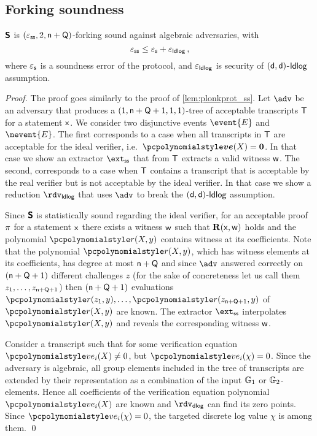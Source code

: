 \documentclass[runningheads,10pt]{llncs}
\let\spvec\vec
\let\vec\accentvec
\let\spvec\vec
\let\vec\spvec
\def\vec#1{\mathchoice{\mbox{\boldmath$\displaystyle#1$}}
  {\mbox{\boldmath$\textstyle#1$}} {\mbox{\boldmath$\scriptstyle#1$}}
  {\mbox{\boldmath$\scriptscriptstyle#1$}}}
\begin{document}
\subsection{Forking soundness}
\begin{lemma}
	\label{lem:sonicprot_ss}
  $\bm{\mathsf{S}}$ is $(\varepsilon_{\mathsf{ss}}, 2, \mathsf{n} + \mathsf{Q})$-forking sound against
  algebraic adversaries, with
  \[
			\varepsilon_{\mathsf{ss}} \leq \varepsilon_{\mathsf{s}} + \varepsilon_{\mathsf{ldlog}}\,,
	\]
	where $\varepsilon_{\mathsf{s}}$ is a soundness error of the protocol, and $\varepsilon_{\mathsf{ldlog}}$ is
  security of $(\mathsf{d}, \mathsf{d})$-$\mathsf{ldlog}$ assumption.
\end{lemma}
\begin{proof}
  The proof goes similarly to the proof of \cref{lem:plonkprot_ss}.
%
  Let $\adv$ be an adversary that produces a
  $(1, \mathsf{n} + \mathsf{Q} + 1, 1, 1)$-tree of acceptable transcripts
  $\mathsf{T}$ for a statement $\mathsf{x}$. We consider two disjunctive events $\event{E}$
  and $\nevent{E}$. The first corresponds to a case when all transcripts in
  $\mathsf{T}$ are acceptable for the ideal verifier,
  i.e.~$\vec{\vereq}(X) = \vec{0}$. In that case we show an extractor $\extss$
  that from $\mathsf{T}$ extracts a valid witness $\mathsf{w}$. The second, corresponds to
  a case when $\mathsf{T}$ contains a transcript that is acceptable by the real
  verifier but is not acceptable by the ideal verifier.  In that case we show a
  reduction $\rdvldlog$ that uses $\adv$ to break the
  $(\mathsf{d}, \mathsf{d})$-$\mathsf{ldlog}$ assumption.

   Since $\bm{\mathsf{S}}$ is statistically sound
  regarding the ideal verifier, for an acceptable proof $\pi$ for a
  statement $\mathsf{x}$ there exists a witness $\mathsf{w}$ such that $\mathbf{R}(\mathsf{x}, \mathsf{w})$
  holds and the polynomial $\p{r}(X, y)$ contains witness at its coefficients.
  Note that the polynomial $\p{r}(X, y)$, which has witness elements at its
  coefficients, has degree at most $\mathsf{n} + \mathsf{Q}$ and since $\adv$
  answered correctly on $(\mathsf{n} + \mathsf{Q} + 1)$ different challenges
  $z$ (for the sake of concreteness let us call them
  $z_1, \ldots, z_{\mathsf{n} + \mathsf{Q} + 1}$) then
  $(\mathsf{n} + \mathsf{Q} + 1)$ evaluations
  $\p{r}(z_1, y), \ldots, \p{r}(z_{\multconstr + \linconstr + 1}, y)$ of
  $\p{r}(X, y)$ are known. The extractor $\extss$ interpolates $\p{r}(X, y)$ and
  reveals the corresponding witness $\mathsf{w}$.

   Consider a transcript such that for some
  verification equation $\vereq_i(X) \neq 0$, but $\vereq_i(\chi) = 0$. Since
  the adversary is algebraic, all group elements included in the tree of
  transcripts are extended by their representation as a combination of the input
  $\mathbb{G}_1$ or $\mathbb{G}_2$-elements. Hence all coefficients of the verification
  equation polynomial $\vereq_i(X)$ are known and $\rdvdlog$ can find its zero
  points. Since $\vereq_i(\chi) = 0$, the targeted discrete log value $\chi$ is
  among them. \qed
\end{proof}
\end{document}
